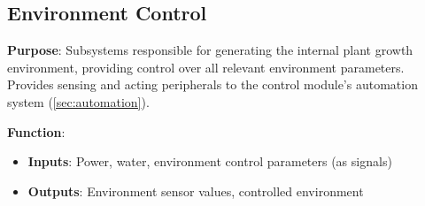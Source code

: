 \documentclass{report}
\begin{document}
\newpage

\subsection{Environment Control}
\label{sec:environment}

\textbf{Purpose}: Subsystems responsible for generating the internal plant growth environment, providing control over all relevant environment parameters. Provides sensing and acting peripherals to the control module's automation system (\ref{sec:automation}).

\textbf{Function}:
\begin{itemize}
    \item \textbf{Inputs}: Power, water, environment control parameters (as signals)
    \item \textbf{Outputs}: Environment sensor values, controlled environment
\end{itemize}
\end{document}
